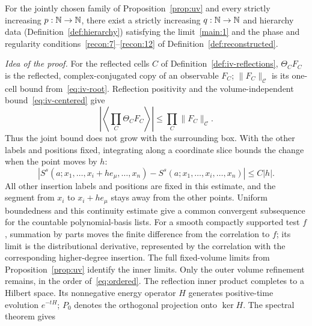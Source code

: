 \begin{proposition}\label{prop:limit}
For the jointly chosen family of Proposition~\ref{prop:uv} and every strictly increasing $p:\mathbb N\to\mathbb N$, there exist a strictly increasing $q:\mathbb N\to\mathbb N$ and hierarchy data (Definition~\ref{def:hierarchy}) satisfying the limit~\ref{main:1} and the phase and regularity conditions~\ref{recon:7}--\ref{recon:12} of Definition~\ref{def:reconstructed}.
\end{proposition}

\emph{Idea of the proof.}
For the reflected cells $C$ of Definition~\ref{def:iv-reflections}, $\Theta_C F_C$ is the reflected, complex-conjugated copy of an observable $F_C$; $\|F_C\|_{\mathcal C}$ is its one-cell bound from~\eqref{eq:iv-root}. Reflection positivity and the volume-independent bound~\eqref{eq:iv-centered} give
\begin{equation*}
 \left|\left\langle\prod_C\Theta_C F_C\right\rangle\right|
 \leq\prod_C\|F_C\|_{\mathcal C}.
\end{equation*}
Thus the joint bound does not grow with the surrounding box.
With the other labels and positions fixed, integrating along a coordinate slice bounds the change when the point moves by $h$:
\begin{equation*}
 \left|S^s(a;x_1,\ldots,x_i+h e_\mu,\ldots,x_n)-S^s(a;x_1,\ldots,x_i,\ldots,x_n)\right|\leq C|h|.
\end{equation*}
All other insertion labels and positions are fixed in this estimate, and the segment from $x_i$ to $x_i+h e_\mu$ stays away from the other points. Uniform boundedness and this continuity estimate give a common convergent subsequence for the countable polynomial-basis lists. For a smooth compactly supported test $f$, summation by parts moves the finite difference from the correlation to $f$; its limit is the distributional derivative, represented by the correlation with the corresponding higher-degree insertion.
The full fixed-volume limits from Proposition~\ref{prop:uv} identify the inner limits. Only the outer volume refinement remains, in the order of~\eqref{eq:ordered}.
The reflection inner product completes to a Hilbert space. Its nonnegative energy operator $H$ generates positive-time evolution $e^{-tH}$; $P_0$ denotes the orthogonal projection onto $\ker H$. The spectral theorem gives
